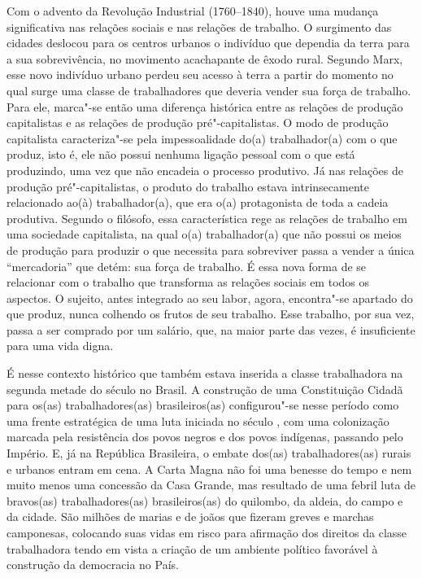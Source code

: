 Com o advento da Revolução Industrial (1760--1840), houve uma mudança
significativa nas relações sociais e nas relações de trabalho. O
surgimento das cidades deslocou para os centros urbanos
o indivíduo que dependia da terra para a
sua sobrevivência, no movimento acachapante de
êxodo rural. Segundo Marx, esse novo indivíduo urbano perdeu seu acesso
à terra a partir do momento no qual surge uma classe de trabalhadores
que deveria vender sua força de trabalho.
Para ele, marca"-se então uma diferença
histórica entre as relações de produção capitalistas e as relações de
produção pré"-capitalistas. O modo de produção capitalista caracteriza"-se
pela impessoalidade do(a) trabalhador(a) com o que produz, isto é, ele
não possui nenhuma ligação pessoal com o que está produzindo, uma vez
que não encadeia o processo produtivo. Já nas relações de produção
pré"-capitalistas, o produto do trabalho estava intrinsecamente
relacionado ao(à) trabalhador(a), que era o(a) protagonista de toda a
cadeia produtiva. Segundo o filósofo, essa característica rege as
relações de trabalho em uma sociedade capitalista, na qual o(a)
trabalhador(a) que não possui os meios de produção para produzir o que
necessita para sobreviver passa a vender a única ``mercadoria'' que
detém: sua força de trabalho. É essa nova forma de se relacionar com o
trabalho que transforma as relações sociais em todos os aspectos. O
sujeito, antes integrado ao seu labor, agora, encontra"-se apartado do
que produz, nunca colhendo os frutos de seu trabalho. Esse trabalho, por
sua vez, passa a ser comprado por um salário, que, na maior parte das
vezes, é insuficiente para uma vida digna.

É nesse contexto histórico que também estava inserida a classe
trabalhadora na segunda metade do século  no Brasil. A construção de
uma Constituição Cidadã para os(as) trabalhadores(as) brasileiros(as)
configurou"-se nesse período como uma frente estratégica de uma luta
iniciada no século , com uma colonização marcada pela resistência dos
povos negros e dos povos indígenas, passando pelo Império. E, já na
República Brasileira, o embate dos(as) trabalhadores(as) rurais e
urbanos entram em cena. A Carta Magna não foi uma benesse do tempo e nem
muito menos uma concessão da Casa Grande, mas resultado de uma febril
luta de bravos(as) trabalhadores(as) brasileiros(as) do quilombo, da
aldeia, do campo e da cidade. São milhões de marias e de joãos que
fizeram greves e marchas camponesas, colocando suas vidas em risco para
afirmação dos direitos da classe trabalhadora tendo em vista a criação
de um ambiente político favorável à construção da democracia no País.

